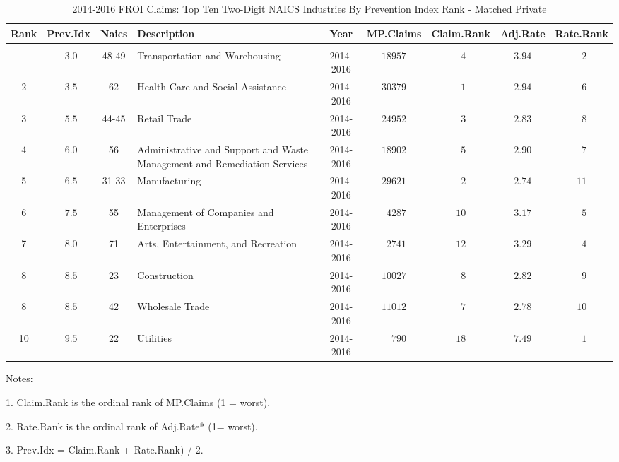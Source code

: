 \documentclass[9pt, oneside]{article}   	%
\begin{document}
\begin{longtable}{cccp{2.5in}ccccc}
\caption{2014-2016 FROI Claims: Top Ten Two-Digit NAICS Industries By Prevention Index Rank - Matched Private}\\
\label{Table: 10aa}
\hline 
\toprule
Rank  & Prev.Idx & Naics & Description & Year & MP.Claims & Claim.Rank & Adj.Rate & \multicolumn{1}{c}{Rate.Rank} \\ 
\midrule\\ [-1\normalbaselineskip]\hline\endhead\hline\endfoot
1  & $\phantom{0}3.0$ & 48-49 & Transportation and Warehousing & 2014-2016 & $18957$ & $\phantom{0}4$ & $3.94$ & $\phantom{0}2$ \\
2  & $\phantom{0}3.5$ & 62 & Health Care and Social Assistance & 2014-2016 & $30379$ & $\phantom{0}1$ & $2.94$ & $\phantom{0}6$ \\
3  & $\phantom{0}5.5$ & 44-45 & Retail Trade & 2014-2016 & $24952$ & $\phantom{0}3$ & $2.83$ & $\phantom{0}8$ \\
4  & $\phantom{0}6.0$ & 56 & Administrative and Support and Waste Management and Remediation Services & 2014-2016 & $18902$ & $\phantom{0}5$ & $2.90$ & $\phantom{0}7$ \\
5  & $\phantom{0}6.5$ & 31-33 & Manufacturing & 2014-2016 & $29621$ & $\phantom{0}2$ & $2.74$ & $11$ \\
6  & $\phantom{0}7.5$ & 55 & Management of Companies and Enterprises & 2014-2016 & $\phantom{0}4287$ & $10$ & $3.17$ & $\phantom{0}5$ \\
7  & $\phantom{0}8.0$ & 71 & Arts, Entertainment, and Recreation & 2014-2016 & $\phantom{0}2741$ & $12$ & $3.29$ & $\phantom{0}4$ \\
8 & $\phantom{0}8.5$ & 23 & Construction & 2014-2016 & $10027$ & $\phantom{0}8$ & $2.82$ & $\phantom{0}9$ \\
8  & $\phantom{0}8.5$ & 42 & Wholesale Trade & 2014-2016 & $11012$ & $\phantom{0}7$ & $2.78$ & $10$ \\
10  & $\phantom{0}9.5$ & 22 & Utilities & 2014-2016 & $\phantom{00}790$ & $18$ & $7.49$ & $\phantom{0}1$ \\
\cline{1-1} \cline{2-2} \cline{3-3} \cline{4-4} \cline{5-5} \cline{6-6} \cline{7-7} \cline{8-8} \cline{9-9} %
\hline 
\end{longtable}

    \begin{tablenotes}
      \small
      Notes:\\
            \item 1. Claim.Rank is the ordinal rank of MP.Claims (1 = worst). \\
            \item 2. Rate.Rank is the ordinal rank of Adj.Rate* (1= worst). \\
            \item 3. Prev.Idx = Claim.Rank + Rate.Rank) / 2. 
    \end{tablenotes}
    
\end{document}
